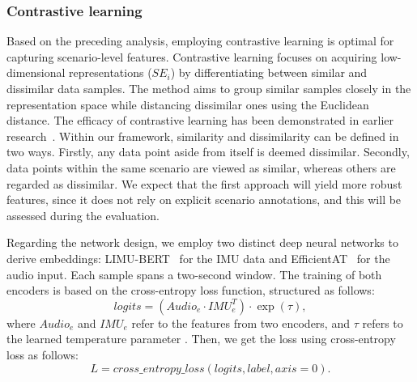 \subsubsection{Contrastive learning}
Based on the preceding analysis, employing contrastive learning is optimal for capturing scenario-level features. Contrastive learning focuses on acquiring low-dimensional representations ($SE_i$) by differentiating between similar and dissimilar data samples. The method aims to group similar samples closely in the representation space while distancing dissimilar ones using the Euclidean distance. The efficacy of contrastive learning has been demonstrated in earlier research~\citep{han2023onellm, girdhar2023imagebind}. 
Within our framework, similarity and dissimilarity can be defined in two ways. Firstly, any data point aside from itself is deemed dissimilar. Secondly, data points within the same scenario are viewed as similar, whereas others are regarded as dissimilar. We expect that the first approach will yield more robust features, since it does not rely on explicit scenario annotations, and this will be assessed during the evaluation.

Regarding the network design, we employ two distinct deep neural networks to derive embeddings: LIMU-BERT~\citep{xu2021limu} for the IMU data and EfficientAT~\citep{lyu2024earda} for the audio input. Each sample spans a two-second window. The training of both encoders is based on the cross-entropy loss function, structured as follows:
\[
logits = (Audio_e \cdot IMU_e^T) \cdot \exp(\tau),
\]
where $Audio_e$ and $IMU_e$ refer to the features from two encoders, and $\tau$ refers to the learned temperature parameter \citep{chen2020simple}. Then, we get the loss using cross-entropy loss as follows:
\[
L = cross\_entropy\_loss(logits, label, axis=0).
\]

